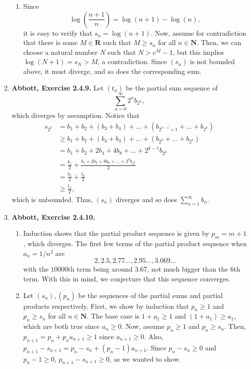 \documentclass{article}
\newcommand{\N}{\mathbf{N}}
\newcommand{\R}{\mathbf{R}}
\newcommand{\exc}[2][Abbott]{\item \textbf{#1, Exercise #2.}}
\let\oldlog\log
\renewcommand{\log}[1]{\oldlog \left( #1 \right)}
\begin{document}
\begin{enumerate}
\begin{enumerate}
        \item Since 
        \begin{equation*}
            \log{\frac{n+1}{n}}= \log{n+1} - \log{n},
        \end{equation*} it is easy to verify that $s_n = \log{n+1}$. Now, assume for contradiction that there is some $M \in \R$ such that $M \geq s_n$ for all $n \in \N$. Then, we can choose a natural number $N$ such that $N > e^M - 1$, but this implies $\log{N+1} = s_N > M$, a contradiction. Since $(s_n)$ is not bounded above, it must diverge, and so does the corresponding sum.
    \end{enumerate}
    
    \exc{2.4.9}
    Let $(t_n)$ be the partial sum sequence of \begin{equation*}
        \sum_{n=0}^\infty 2^n b_{2^n},
    \end{equation*} which diverges by assumption. Notice that 
    \begin{align*}
        s_{2^k} &= b_1 + b_2 + (b_3 + b_4) + \dots + (b_{2^{k-1}+1} + \dots + b_{2^k}) \\
        &\geq b_1 + b_2 + (b_4 + b_4) + \dots + (b_{2^k} + \dots + b_{2^k}) \\
        &= b_1 + b_2 + 2b_4 + 4b_8 + \dots + 2^{k-1}b_{2^k} \\
        &= \frac{b_1}{2} + \frac{b_1 + 2b_2 + 8b_8 + \dots + 2^k b_{2^k}}{2} \\
        &= \frac{b_1}{2} + \frac{t_k}{2} \\
        &\geq \frac{t_k}{2},
    \end{align*} which is unbounded. Thus, $(s_n)$ diverges and so does $\sum_{n=1}^\infty b_n.$
    
    \exc{2.4.10}
    \begin{enumerate}
        \item Induction shows that the partial product sequence is given by $p_m = m+1$, which diverges. The first few terms of the partial product sequence when $a_n = 1/n^2$ are 
        \begin{equation*}
            2, 2.5, 2.77\dots, 2.95\dots,3.069\dots
        \end{equation*} with the $10000$th term being around $3.67$, not much bigger than the $6$th term. With this in mind, we conjecture that this sequence converges.
        
        \item Let $(s_n),(p_n)$ be the sequences of the partial sums and partial products respectively. First, we show by induction that $p_n \geq 1$ and $p_n \geq s_n$ for all $n \in \N$. The base case is $1+a_1 \geq 1$ and $(1+a_1) \geq a_1$, which are both true since $a_n \geq 0$. Now, assume $p_n \geq 1$ and $p_n \geq s_n$. Then, $p_{n+1} = p_n + p_{n}a_{n+1} \geq 1$ since $a_{n+1} \geq 0$. Also, $p_{n+1}-s_{n+1} = p_n-s_n + (p_{n}-1)a_{n+1}$. Since $p_n - s_n \geq 0$ and $p_n -1 \geq 0$, $p_{n+1}-s_{n+1} \geq 0$, as we wanted to show.
        

\end{enumerate}
\end{enumerate}
\end{document}

